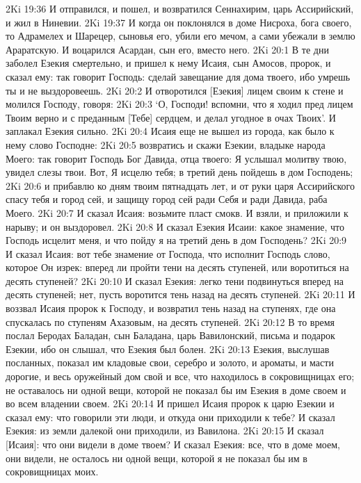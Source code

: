 2Ki 19:36  И отправился, и пошел, и возвратился Сеннахирим, царь Ассирийский, и жил в Ниневии.
2Ki 19:37  И когда он поклонялся в доме Нисроха, бога своего, то Адрамелех и Шарецер, сыновья его, убили его мечом, а сами убежали в землю Араратскую. И воцарился Асардан, сын его, вместо него.
2Ki 20:1  В те дни заболел Езекия смертельно, и пришел к нему Исаия, сын Амосов, пророк, и сказал ему: так говорит Господь: сделай завещание для дома твоего, ибо умрешь ты и не выздоровеешь.
2Ki 20:2  И отворотился [Езекия] лицем своим к стене и молился Господу, говоря:
2Ki 20:3  `О, Господи! вспомни, что я ходил пред лицем Твоим верно и с преданным [Тебе] сердцем, и делал угодное в очах Твоих'. И заплакал Езекия сильно.
2Ki 20:4  Исаия еще не вышел из города, как было к нему слово Господне:
2Ki 20:5  возвратись и скажи Езекии, владыке народа Моего: так говорит Господь Бог Давида, отца твоего: Я услышал молитву твою, увидел слезы твои. Вот, Я исцелю тебя; в третий день пойдешь в дом Господень;
2Ki 20:6  и прибавлю ко дням твоим пятнадцать лет, и от руки царя Ассирийского спасу тебя и город сей, и защищу город сей ради Себя и ради Давида, раба Моего.
2Ki 20:7  И сказал Исаия: возьмите пласт смокв. И взяли, и приложили к нарыву; и он выздоровел.
2Ki 20:8  И сказал Езекия Исаии: какое знамение, что Господь исцелит меня, и что пойду я на третий день в дом Господень?
2Ki 20:9  И сказал Исаия: вот тебе знамение от Господа, что исполнит Господь слово, которое Он изрек: вперед ли пройти тени на десять ступеней, или воротиться на десять ступеней?
2Ki 20:10  И сказал Езекия: легко тени подвинуться вперед на десять ступеней; нет, пусть воротится тень назад на десять ступеней.
2Ki 20:11  И воззвал Исаия пророк к Господу, и возвратил тень назад на ступенях, где она спускалась по ступеням Ахазовым, на десять ступеней.
2Ki 20:12  В то время послал Беродах Баладан, сын Баладана, царь Вавилонский, письма и подарок Езекии, ибо он слышал, что Езекия был болен.
2Ki 20:13  Езекия, выслушав посланных, показал им кладовые свои, серебро и золото, и ароматы, и масти дорогие, и весь оружейный дом свой и все, что находилось в сокровищницах его; не оставалось ни одной вещи, которой не показал бы им Езекия в доме своем и во всем владении своем.
2Ki 20:14  И пришел Исаия пророк к царю Езекии и сказал ему: что говорили эти люди, и откуда они приходили к тебе? И сказал Езекия: из земли далекой они приходили, из Вавилона.
2Ki 20:15  И сказал [Исаия]: что они видели в доме твоем? И сказал Езекия: все, что в доме моем, они видели, не осталось ни одной вещи, которой я не показал бы им в сокровищницах моих.
